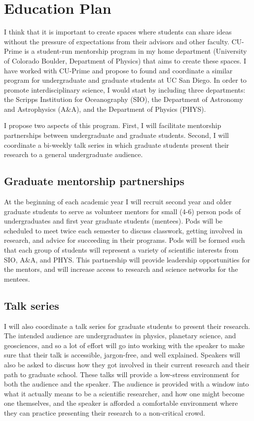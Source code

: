 \documentclass[12pt]{article}
\begin{document}
\section{Education Plan}
I think that it is important to create spaces where students can share ideas without the pressure of expectations from their advisors and other faculty.
CU-Prime\citep{cup} is a student-run mentorship program in my home department (University of Colorado Boulder, Department of Physics) that aims to create these spaces. 
I have worked with CU-Prime and propose to found and coordinate a similar program for undergraduate and graduate students at UC San Diego. In order to promote interdisciplinary science, I would start by including three departments: the Scripps Institution for Oceanography (SIO), the Department of Astronomy and Astrophysics (A\&A), and the Department of Physics (PHYS). 

I propose two aspects of this program. First, I will facilitate mentorship partnerships between undergraduate and graduate students. Second, I will coordinate a bi-weekly talk series in which graduate students present their research to a general undergraduate audience. 

\subsection{Graduate mentorship partnerships}
At the beginning of each academic year I will recruit second year and older graduate students to serve as volunteer mentors for small (4-6) person pods of undergraduates and first year graduate students (mentees). Pods will be scheduled to meet twice each semester to discuss classwork, getting involved in research, and advice for succeeding in their programs. 
Pods will be formed such that each group of students will represent a variety of scientific interests from SIO, A\&A, and PHYS. 
This partnership will provide leadership opportunities for the mentors, and will increase access to research and science networks for the mentees.
\subsection{Talk series}
I will also coordinate a talk series for graduate students to present their research. The intended audience are undergraduates in physics, planetary science, and geosciences, and so a lot of effort will go into working with the speaker to make sure that their talk is accessible, jargon-free, and well explained. Speakers will also be asked to discuss how they got involved in their current research and their path to graduate school. These talks will provide a low-stress environment for both the audience and the speaker.
The audience is provided with a window into what it actually means to be a scientific researcher, and how one might become one themselves, and the speaker is afforded a comfortable environment where they can practice presenting their research to a non-critical crowd.
\end{document}
